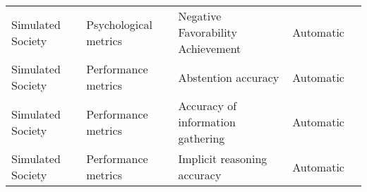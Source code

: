 \begin{small}
\begin{center}
\begin{longtable}{@{}p{}p{}p{}p{}p{}@{}}
Simulated Society        & Psychological metrics & Negative Favorability Achievement                                                                                                                                                                           & Automatic & \cite{gu2024agentgroupchatinteractivegroupchat}                                                                                                                                                                                                                                                                                                                                                                                        \\
Simulated Society        & Performance metrics                 & Abstention accuracy                                                                                                                                                                                         & Automatic & \cite{ashkinaze2024pluralsguidingllmssimulated}                                                                                                                                                                                                                                                                                                                                                                                              \\
Simulated Society        & Performance metrics                 & Accuracy of information gathering                                                                                                                                                                           & Automatic & \cite{kaiya2023lyfeagentsgenerativeagents}                                                                                                                                                                                                                                                                                                                                                                                              \\
Simulated Society        & Performance metrics                 & Implicit reasoning accuracy                                                                                                                                                                                 & Automatic & \cite{mou2024agentsensebenchmarkingsocialintelligence}                                                                                                                                                                                                                                                                                                                                                                                               \\

\end{longtable}
\end{center}
\end{small}

